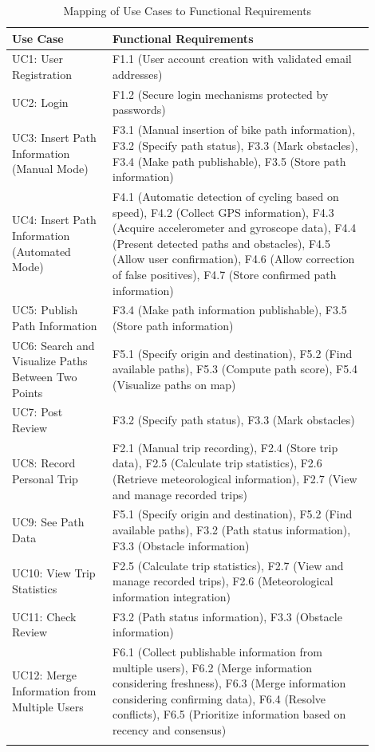 \begin{table}[H]
    \centering
    \small
    \begin{longtable}{ |p{0.25\linewidth}|p{0.65\linewidth}| }
        \hline
        \textbf{Use Case} & \textbf{Functional Requirements} \\
        \hline
        UC1: User Registration & F1.1 (User account creation with validated email addresses) \\
        \hline
        UC2: Login & F1.2 (Secure login mechanisms protected by passwords) \\
        \hline
        UC3: Insert Path Information (Manual Mode) & F3.1 (Manual insertion of bike path information), F3.2 (Specify path status), F3.3 (Mark obstacles), F3.4 (Make path publishable), F3.5 (Store path information) \\
        \hline
        UC4: Insert Path Information (Automated Mode) & F4.1 (Automatic detection of cycling based on speed), F4.2 (Collect GPS information), F4.3 (Acquire accelerometer and gyroscope data), F4.4 (Present detected paths and obstacles), F4.5 (Allow user confirmation), F4.6 (Allow correction of false positives), F4.7 (Store confirmed path information) \\
        \hline
        UC5: Publish Path Information & F3.4 (Make path information publishable), F3.5 (Store path information) \\
        \hline
        UC6: Search and Visualize Paths Between Two Points & F5.1 (Specify origin and destination), F5.2 (Find available paths), F5.3 (Compute path score), F5.4 (Visualize paths on map) \\
        \hline
        UC7: Post Review & F3.2 (Specify path status), F3.3 (Mark obstacles) \\
        \hline
        UC8: Record Personal Trip & F2.1 (Manual trip recording), F2.4 (Store trip data), F2.5 (Calculate trip statistics), F2.6 (Retrieve meteorological information), F2.7 (View and manage recorded trips) \\
        \hline
        UC9: See Path Data & F5.1 (Specify origin and destination), F5.2 (Find available paths), F3.2 (Path status information), F3.3 (Obstacle information) \\
        \hline
        UC10: View Trip Statistics & F2.5 (Calculate trip statistics), F2.7 (View and manage recorded trips), F2.6 (Meteorological information integration) \\
        \hline
        UC11: Check Review & F3.2 (Path status information), F3.3 (Obstacle information) \\
        \hline
        UC12: Merge Information from Multiple Users & F6.1 (Collect publishable information from multiple users), F6.2 (Merge information considering freshness), F6.3 (Merge information considering confirming data), F6.4 (Resolve conflicts), F6.5 (Prioritize information based on recency and consensus) \\
        \hline
        \caption{Mapping of Use Cases to Functional Requirements}
        \label{tab:mapping_use_cases_requirements}
    \end{longtable}
    \normalsize
\end{table}

